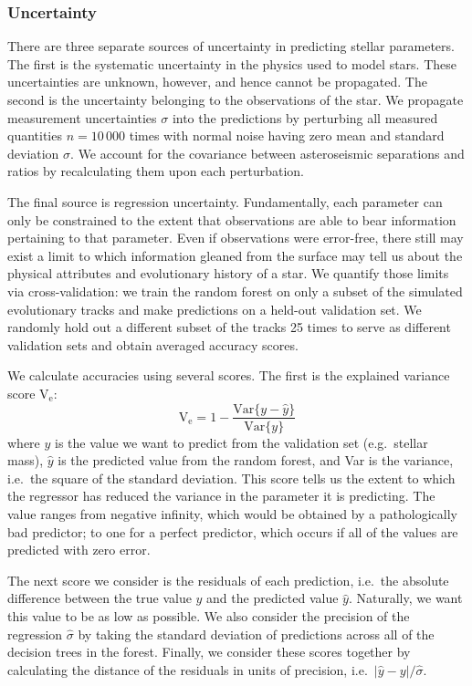 \documentclass[manuscript,linenumbers]{aastex6}
\newcommand\abs[1]{\left|#1\right|}
\begin{document}
\subsubsection{Uncertainty}
\label{sec:uncertainties}
There are three separate sources of uncertainty in predicting stellar parameters. The first is the systematic uncertainty in the physics used to model stars. These uncertainties are unknown, however, and hence cannot be propagated. The second is the uncertainty belonging to the observations of the star. We propagate measurement uncertainties $\sigma$ into the predictions by perturbing all measured quantities $n=10\,000$ times with normal noise having zero mean and standard deviation $\sigma$. We account for the covariance between asteroseismic separations and ratios by recalculating them upon each perturbation. 

The final source is regression uncertainty. Fundamentally, each parameter can only be constrained to the extent that observations are able to bear information pertaining to that parameter. Even if observations were error-free, there still may exist a limit to which information gleaned from the surface may tell us about the physical attributes and evolutionary history of a star. We quantify those limits via cross-validation: we train the random forest on only a subset of the simulated evolutionary tracks and make predictions on a held-out validation set. We randomly hold out a different subset of the tracks 25 times to serve as different validation sets and obtain averaged accuracy scores.

We calculate accuracies using several scores. The first is the explained variance score V$_{\text{e}}$:
\begin{equation}
  \text{V}_{\text{e}} = 1 - \frac{\text{Var}\{ y - \hat y \}}{\text{Var}\{ y \}}
\end{equation}
where $y$ is the value we want to predict from the validation set (e.g.\ stellar mass), $\hat y$ is the predicted value from the random forest, and Var is the variance, i.e.\ the square of the standard deviation. This score tells us the extent to which the regressor has reduced the variance in the parameter it is predicting. The value ranges from negative infinity, which would be obtained by a pathologically bad predictor; to one for a perfect predictor, which occurs if all of the values are predicted with zero error. 

The next score we consider is the residuals of each prediction, i.e.\ the absolute difference between the true value $y$ and the predicted value $\hat y$. Naturally, we want this value to be as low as possible. We also consider the precision of the regression $\hat \sigma$ by taking the standard deviation of predictions across all of the decision trees in the forest. Finally, we consider these scores together by calculating the distance of the residuals in units of precision, i.e.\ $\abs{\hat y - y} / \hat{\sigma}$. 
\end{document}
